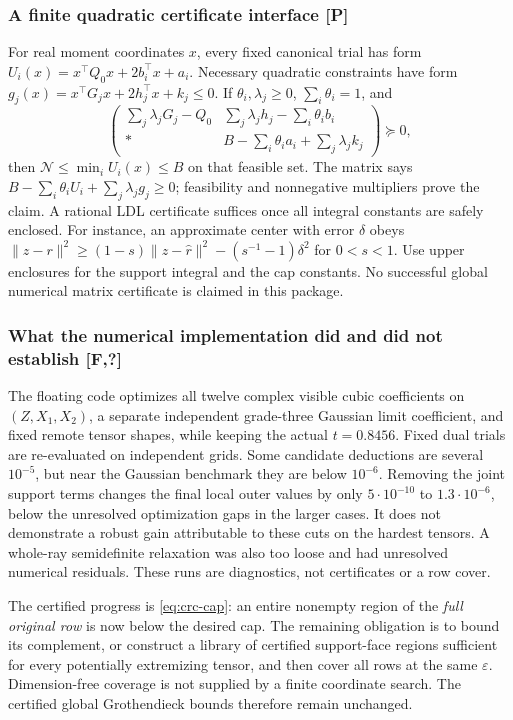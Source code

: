 \subsubsection{A finite quadratic certificate interface [P]}
For real moment coordinates $x$, every fixed canonical trial has form
$U_i(x)=x^\top Q_0x+2b_i^\top x+a_i$.
Necessary quadratic constraints have form
$g_j(x)=x^\top G_jx+2h_j^\top x+k_j\le0$.
If $\theta_i,\lambda_j\ge0$, $\sum_i\theta_i=1$, and
\[
 \begin{pmatrix}
 \sum_j\lambda_jG_j-Q_0&\sum_j\lambda_jh_j-\sum_i\theta_i b_i\\
 *&B-\sum_i\theta_i a_i+\sum_j\lambda_j k_j
 \end{pmatrix}\succeq0,
\]
then $\mathcal N\le\min_iU_i(x)\le B$ on that feasible set.
The matrix says $B-\sum_i\theta_iU_i+\sum_j\lambda_jg_j\ge0$;
feasibility and nonnegative multipliers prove the claim.
A rational LDL certificate suffices once all integral constants are safely
enclosed. For instance, an approximate center with error $\delta$ obeys
$\|z-r\|^2\ge(1-s)\|z-\hat r\|^2-(s^{-1}-1)\delta^2$ for $0<s<1$.
Use upper enclosures for the support integral and the cap constants.
No successful global numerical matrix certificate is claimed in this package.

\subsubsection{What the numerical implementation did and did not establish [F,?]}
The floating code optimizes all twelve complex visible cubic coefficients
on $(Z,X_1,X_2)$, a separate independent grade-three Gaussian limit
coefficient, and fixed remote tensor shapes, while keeping the actual
$t=0.8456$. Fixed dual trials are re-evaluated on independent grids.
Some candidate deductions are several $10^{-5}$, but near the Gaussian
benchmark they are below $10^{-6}$. Removing the joint support terms
changes the final local outer values by only $5\cdot10^{-10}$ to
$1.3\cdot10^{-6}$, below the unresolved optimization gaps in the larger
cases. It does not demonstrate a robust gain attributable to these cuts
on the hardest tensors. A whole-ray semidefinite relaxation was also too
loose and had unresolved numerical residuals. These runs are diagnostics,
not certificates or a row cover.

The certified progress is \eqref{eq:crc-cap}: an entire nonempty region of
the \emph{full original row} is now below the desired cap. The remaining
obligation is to bound its complement, or construct a library of certified
support-face regions sufficient for every potentially extremizing tensor,
and then cover all rows at the same $\varepsilon$. Dimension-free coverage
is not supplied by a finite coordinate search. The certified global
Grothendieck bounds therefore remain unchanged.

